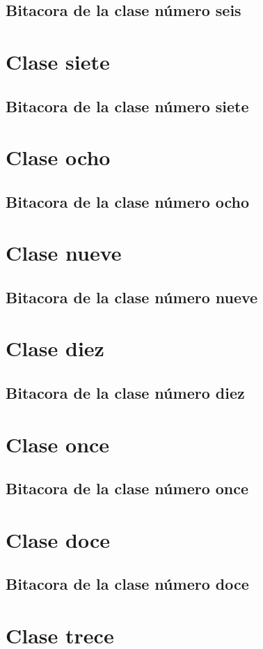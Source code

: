 \documentclass{book}
\begin{document}
\section{Bitacora de la clase número seis}
\chapter{Clase siete}
\section{Bitacora de la clase número siete}
\chapter{Clase ocho}
\section{Bitacora de la clase número ocho}
\chapter{Clase nueve}
\section{Bitacora de la clase número nueve}
\chapter{Clase diez}
\section{Bitacora de la clase número diez}
\chapter{Clase once}
\section{Bitacora de la clase número once}
\chapter{Clase doce}
\section{Bitacora de la clase número doce}
\chapter{Clase trece}
\end{document}
